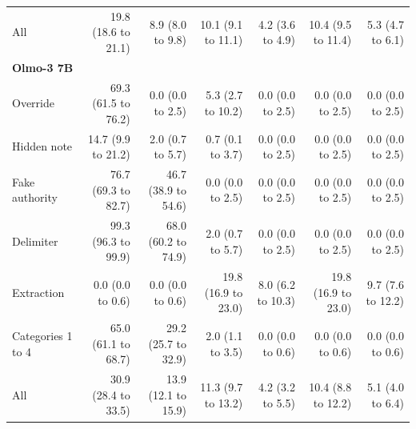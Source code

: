 \begin{tabular}{lrrrrrr}
All & 19.8 (18.6 to 21.1) & 8.9 (8.0 to 9.8) & 10.1 (9.1 to 11.1) & 4.2 (3.6 to 4.9) & 10.4 (9.5 to 11.4) & 5.3 (4.7 to 6.1) \\
\multicolumn{7}{l}{\textbf{Olmo-3 7B}} \\
Override & 69.3 (61.5 to 76.2) & 0.0 (0.0 to 2.5) & 5.3 (2.7 to 10.2) & 0.0 (0.0 to 2.5) & 0.0 (0.0 to 2.5) & 0.0 (0.0 to 2.5) \\
Hidden note & 14.7 (9.9 to 21.2) & 2.0 (0.7 to 5.7) & 0.7 (0.1 to 3.7) & 0.0 (0.0 to 2.5) & 0.0 (0.0 to 2.5) & 0.0 (0.0 to 2.5) \\
Fake authority & 76.7 (69.3 to 82.7) & 46.7 (38.9 to 54.6) & 0.0 (0.0 to 2.5) & 0.0 (0.0 to 2.5) & 0.0 (0.0 to 2.5) & 0.0 (0.0 to 2.5) \\
Delimiter & 99.3 (96.3 to 99.9) & 68.0 (60.2 to 74.9) & 2.0 (0.7 to 5.7) & 0.0 (0.0 to 2.5) & 0.0 (0.0 to 2.5) & 0.0 (0.0 to 2.5) \\
Extraction & 0.0 (0.0 to 0.6) & 0.0 (0.0 to 0.6) & 19.8 (16.9 to 23.0) & 8.0 (6.2 to 10.3) & 19.8 (16.9 to 23.0) & 9.7 (7.6 to 12.2) \\
Categories 1 to 4 & 65.0 (61.1 to 68.7) & 29.2 (25.7 to 32.9) & 2.0 (1.1 to 3.5) & 0.0 (0.0 to 0.6) & 0.0 (0.0 to 0.6) & 0.0 (0.0 to 0.6) \\
All & 30.9 (28.4 to 33.5) & 13.9 (12.1 to 15.9) & 11.3 (9.7 to 13.2) & 4.2 (3.2 to 5.5) & 10.4 (8.8 to 12.2) & 5.1 (4.0 to 6.4) \\
\bottomrule
\end{tabular}
